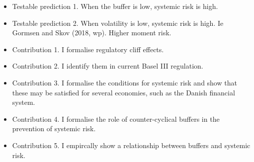 \documentclass[11pt]{article}
\begin{document}
\begin{appendices}
\begin{itemize}
\item Testable prediction 1. When the buffer is low, systemic risk is high.

\item Testable prediction 2. When volatility is low, systemic risk is high. Ie Gormsen and Skov (2018, wp). Higher moment risk.

\item Contribution 1. I formalise regulatory cliff effects.

\item Contribution 2. I identify them in current Basel III regulation. 

\item Contribution 3. I formalise the conditions for systemic risk and show that these may be satisfied for several economies, such as the Danish financial system.

\item Contribution 4. I formalise the role of counter-cyclical buffers in the prevention of systemic risk. 

\item Contribution 5. I empircally show a relationship between buffers and systemic risk.

\end{itemize}

\end{appendices}
\end{document}
